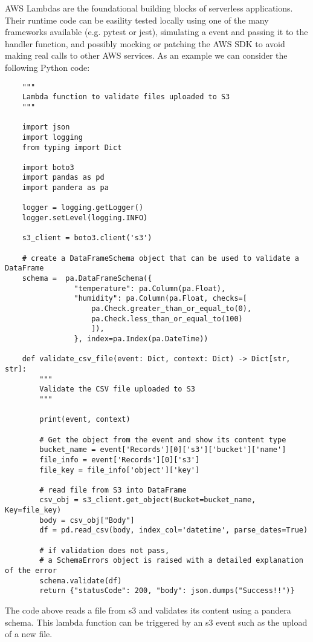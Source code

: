 \documentclass{article}
\begin{document}
AWS Lambdas are the foundational building blocks of serverless applications.
Their runtime code can be easility tested locally using one of the many frameworks available (e.g. pytest or jest), simulating a event and passing it to the handler function, and possibly mocking or patching the AWS SDK to avoid making real calls to other AWS services. As an example we can consider the following Python code:

\begin{verbatim}
    """
    Lambda function to validate files uploaded to S3
    """

    import json
    import logging
    from typing import Dict

    import boto3
    import pandas as pd
    import pandera as pa

    logger = logging.getLogger()
    logger.setLevel(logging.INFO)

    s3_client = boto3.client('s3')

    # create a DataFrameSchema object that can be used to validate a DataFrame
    schema =  pa.DataFrameSchema({
                "temperature": pa.Column(pa.Float),
                "humidity": pa.Column(pa.Float, checks=[
                    pa.Check.greater_than_or_equal_to(0),
                    pa.Check.less_than_or_equal_to(100)
                    ]),
                }, index=pa.Index(pa.DateTime))

    def validate_csv_file(event: Dict, context: Dict) -> Dict[str, str]:
        """
        Validate the CSV file uploaded to S3
        """

        print(event, context)

        # Get the object from the event and show its content type
        bucket_name = event['Records'][0]['s3']['bucket']['name']
        file_info = event['Records'][0]['s3']
        file_key = file_info['object']['key']

        # read file from S3 into DataFrame
        csv_obj = s3_client.get_object(Bucket=bucket_name, Key=file_key)
        body = csv_obj["Body"]
        df = pd.read_csv(body, index_col='datetime', parse_dates=True)

        # if validation does not pass,
        # a SchemaErrors object is raised with a detailed explanation of the error
        schema.validate(df)
        return {"statusCode": 200, "body": json.dumps("Success!!")}
\end{verbatim}

The code above reads a file from s3 and validates its content using a pandera schema. This lambda function can be triggered by an s3 event such as the upload of a new file.
\end{document}
